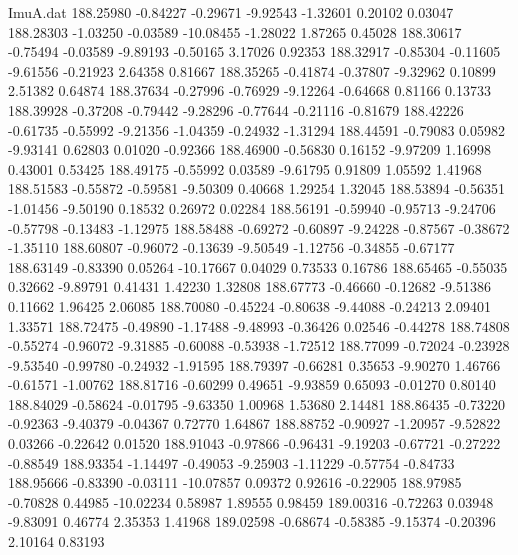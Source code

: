 \begin{filecontents}{ImuA.dat}
 188.25980   -0.84227   -0.29671   -9.92543   -1.32601    0.20102    0.03047
 188.28303   -1.03250   -0.03589  -10.08455   -1.28022    1.87265    0.45028
 188.30617   -0.75494   -0.03589   -9.89193   -0.50165    3.17026    0.92353
 188.32917   -0.85304   -0.11605   -9.61556   -0.21923    2.64358    0.81667
 188.35265   -0.41874   -0.37807   -9.32962    0.10899    2.51382    0.64874
 188.37634   -0.27996   -0.76929   -9.12264   -0.64668    0.81166    0.13733
 188.39928   -0.37208   -0.79442   -9.28296   -0.77644   -0.21116   -0.81679
 188.42226   -0.61735   -0.55992   -9.21356   -1.04359   -0.24932   -1.31294
 188.44591   -0.79083    0.05982   -9.93141    0.62803    0.01020   -0.92366
 188.46900   -0.56830    0.16152   -9.97209    1.16998    0.43001    0.53425
 188.49175   -0.55992    0.03589   -9.61795    0.91809    1.05592    1.41968
 188.51583   -0.55872   -0.59581   -9.50309    0.40668    1.29254    1.32045
 188.53894   -0.56351   -1.01456   -9.50190    0.18532    0.26972    0.02284
 188.56191   -0.59940   -0.95713   -9.24706   -0.57798   -0.13483   -1.12975
 188.58488   -0.69272   -0.60897   -9.24228   -0.87567   -0.38672   -1.35110
 188.60807   -0.96072   -0.13639   -9.50549   -1.12756   -0.34855   -0.67177
 188.63149   -0.83390    0.05264  -10.17667    0.04029    0.73533    0.16786
 188.65465   -0.55035    0.32662   -9.89791    0.41431    1.42230    1.32808
 188.67773   -0.46660   -0.12682   -9.51386    0.11662    1.96425    2.06085
 188.70080   -0.45224   -0.80638   -9.44088   -0.24213    2.09401    1.33571
 188.72475   -0.49890   -1.17488   -9.48993   -0.36426    0.02546   -0.44278
 188.74808   -0.55274   -0.96072   -9.31885   -0.60088   -0.53938   -1.72512
 188.77099   -0.72024   -0.23928   -9.53540   -0.99780   -0.24932   -1.91595
 188.79397   -0.66281    0.35653   -9.90270    1.46766   -0.61571   -1.00762
 188.81716   -0.60299    0.49651   -9.93859    0.65093   -0.01270    0.80140
 188.84029   -0.58624   -0.01795   -9.63350    1.00968    1.53680    2.14481
 188.86435   -0.73220   -0.92363   -9.40379   -0.04367    0.72770    1.64867
 188.88752   -0.90927   -1.20957   -9.52822    0.03266   -0.22642    0.01520
 188.91043   -0.97866   -0.96431   -9.19203   -0.67721   -0.27222   -0.88549
 188.93354   -1.14497   -0.49053   -9.25903   -1.11229   -0.57754   -0.84733
 188.95666   -0.83390   -0.03111  -10.07857    0.09372    0.92616   -0.22905
 188.97985   -0.70828    0.44985  -10.02234    0.58987    1.89555    0.98459
 189.00316   -0.72263    0.03948   -9.83091    0.46774    2.35353    1.41968
 189.02598   -0.68674   -0.58385   -9.15374   -0.20396    2.10164    0.83193

\end{filecontents}
